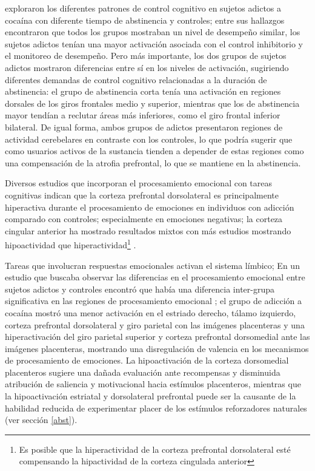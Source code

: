 \textcite{Connolly2012} exploraron los diferentes patrones de control cognitivo en sujetos adictos a cocaína con diferente tiempo de abstinencia y controles;
entre sus hallazgos encontraron que todos los grupos mostraban un nivel de desempeño similar, los sujetos adictos tenían una mayor activación asociada con el control inhibitorio y el monitoreo de desempeño. Pero más importante, los dos grupos de sujetos adictos mostraron diferencias entre sí en los niveles de activación, sugiriendo diferentes demandas de control cognitivo relacionadas a la duración de abstinencia: el grupo de abstinencia corta tenía una activación en regiones dorsales de los giros frontales medio y superior, mientras que los de abstinencia mayor tendían a reclutar áreas más inferiores, como el giro frontal inferior bilateral.
De igual forma, ambos grupos de adictos presentaron regiones de actividad cerebelares en contraste con los controles, lo que podría sugerir que como usuarios activos de la sustancia tienden a depender de estas regiones como una compensación de la atrofia prefrontal, lo que se mantiene en la abstinencia. \par
Diversos estudios que incorporan el procesamiento emocional con tareas cognitivas indican que la corteza prefrontal dorsolateral es principalmente hiperactiva durante el procesamiento de emociones en individuos con adicción comparado con controles; especialmente en emociones negativas; la corteza cingular anterior ha mostrado resultados mixtos \textemdash{}con más estudios mostrando hipoactividad que hiperactividad\footnote{Es posible que la hiperactividad de la corteza prefrontal dorsolateral esté compensando la hipactividad de la corteza cingulada anterior} \parencite{Goldstein2012a}.\par
Tareas que involucran respuestas emocionales activan el sistema límbico; En un estudio que buscaba observar las diferencias en el procesamiento emocional entre sujetos adictos y controles encontró que había una diferencia inter-grupa significativa en las regiones de procesamiento emocional \parencite{Asensio2010}; el grupo de adicción a cocaína mostró una menor activación en el estriado derecho, tálamo izquierdo, corteza prefrontal dorsolateral y giro parietal con las imágenes placenteras y una hiperactivación del giro parietal superior y corteza prefrontal dorsomedial ante las imágenes placenteras, mostrando una disregulación de valencia en los mecanismos de procesamiento de emociones.
La hipoactivación de la corteza dorsomedial placenteros sugiere una dañada evaluación ante recompensas y disminuida atribución de saliencia y motivacional hacia estímulos placenteros, mientras que la hipoactivación estriatal y dorsolateral prefrontal puede ser la causante de la habilidad reducida de experimentar placer de los estímulos reforzadores naturales (ver sección \ref{abst}).

